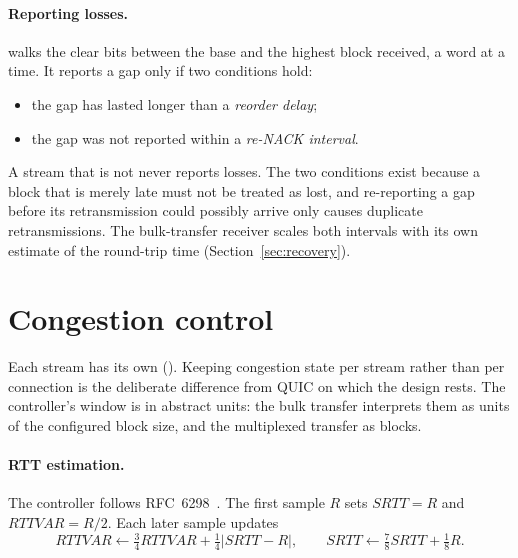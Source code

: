 \paragraph{Reporting losses.}  walks the clear bits between the base and the highest block
received, a word at a time. It reports a gap only if two conditions hold:
\begin{itemize}
  \item the gap has lasted longer than a \emph{reorder delay};
  \item the gap was not reported within a \emph{re-NACK interval}.
\end{itemize}
A stream that is not  never reports losses. The two conditions exist because a block that is
merely late must not be treated as lost, and re-reporting a gap before its retransmission could possibly arrive
only causes duplicate retransmissions. The bulk-transfer receiver scales both intervals with its own estimate of
the round-trip time (Section~\ref{sec:recovery}).

\section{Congestion control}\label{sec:cc}

Each  stream has its own  (). Keeping congestion
state per stream rather than per connection is the deliberate difference from QUIC on which the design rests.
The controller's window is in abstract units: the bulk transfer interprets them as units of the configured
block size\vviii, and the multiplexed transfer as blocks.

\paragraph{RTT estimation.} The controller follows RFC~6298~\cite{rfc6298}. The first sample $R$ sets
$\mathit{SRTT}=R$ and $\mathit{RTTVAR}=R/2$. Each later sample updates
\[
\mathit{RTTVAR}\leftarrow\tfrac34\mathit{RTTVAR}+\tfrac14\lvert \mathit{SRTT}-R\rvert,\qquad
\mathit{SRTT}\leftarrow\tfrac78\mathit{SRTT}+\tfrac18R .
\]

